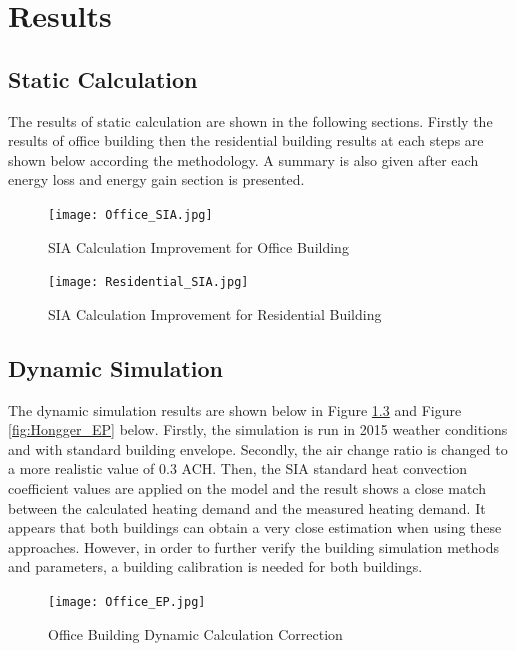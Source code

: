 \chapter{Results}

	\section{Static Calculation}
		The results of static calculation are shown in the following sections. Firstly the results of office building then the residential building results at each steps are shown below according the methodology. A summary is also given after each energy loss and energy gain section is presented.

		\begin{figure}[H]
		\centering
		\texttt{[image: Office\_SIA.jpg]}
		\caption{SIA Calculation Improvement for Office Building}
		\label{fig:Sumatra_SIA}
		\end{figure}
		
		\begin{figure}[h!]
		\centering
		\texttt{[image: Residential\_SIA.jpg]}
		\caption{SIA Calculation Improvement for Residential Building}
		\label{fig:Hongger_SIA}
		\end{figure}
		
		
			  
	\section{Dynamic Simulation}		
			The dynamic simulation results are shown below in Figure \ref{fig:Sumatra_EP} and Figure \ref{fig:Hongger_EP} below. Firstly, the simulation is run in 2015 weather conditions and with standard building envelope. Secondly, the air change ratio is changed to a more realistic value of 0.3 ACH. Then, the SIA standard heat convection coefficient values are applied on the model and the result shows a close match between the calculated heating demand and the measured heating demand. It appears that both buildings can obtain a very close estimation when using these approaches. However, in order to further verify the building simulation methods and parameters, a building calibration is needed for both buildings.
		

		\begin{figure}[H]
		\centering
		\texttt{[image: Office\_EP.jpg]}
		\caption{Office Building Dynamic Calculation Correction}
		\label{fig:Sumatra_EP}
		\end{figure}

